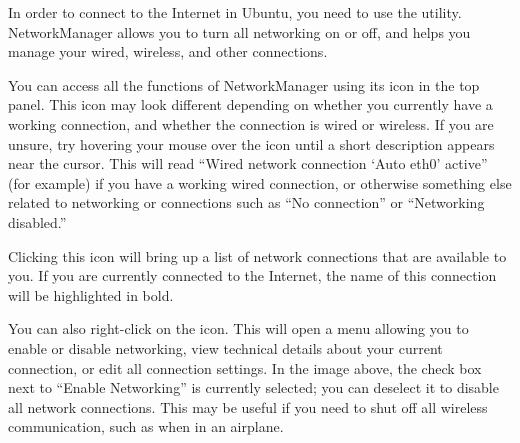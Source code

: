 In order to connect to the Internet in Ubuntu, you need to use 
the  utility. NetworkManager allows you 
to turn all networking on or off, and helps you manage your wired, 
wireless, and other connections.



You can access all the functions of NetworkManager using its icon in the top panel. This icon may look different depending on whether you currently have a working connection, and whether the connection is wired or wireless. If you are unsure, try hovering your mouse over the icon until a short description appears near the cursor. This will read ``Wired network connection `Auto eth$0$' active'' (for example) if you have a working wired connection, or otherwise something else related to networking or connections such as ``No connection'' or ``Networking disabled.''

\clearpage{}

Clicking this icon will bring up a list of network connections that are available to you. If you are currently connected to the Internet, the name of this connection will be highlighted in bold.


You can also right-click on the  icon. This will open a menu allowing you to enable or disable networking, view technical details about your current connection, or edit all 
connection settings. In the image above, the check box next to ``Enable Networking'' is currently selected; you can deselect it to disable all network connections. This may be useful if you need to shut off all wireless communication, such as when in an airplane.

